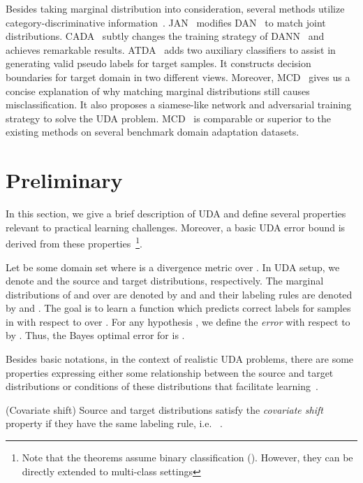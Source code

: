 \documentclass[10pt,twocolumn,letterpaper]{article}
\begin{document}
Besides taking marginal distribution into consideration, several methods utilize category-discriminative information~\cite{8451152,10.1007/978-3-030-01424-7_34,DAS201880}. JAN~\cite{long2017deep} modifies DAN~\cite{pmlr-v37-long15} to match joint distributions. CADA~\cite{long2018conditional} subtly changes the training strategy of DANN~\cite{ganin2016domain} and achieves remarkable results. ATDA~\cite{pmlr-v70-saito17a} adds two auxiliary classifiers to assist in generating valid pseudo labels for target samples. It constructs decision boundaries for target domain in two different views. Moreover, MCD~\cite{saito2018maximum} gives us a concise explanation of why matching marginal distributions still causes misclassification. It also proposes a siamese-like network and adversarial training strategy to solve the UDA problem. MCD~\cite{saito2018maximum} is comparable or superior to the existing methods on several benchmark domain adaptation datasets.

\section{Preliminary}
\label{prelinary}
In this section, we give a brief description of UDA and define several properties relevant to practical learning challenges. Moreover, a basic UDA error bound is derived from these properties~\cite{Ben-David2014}\footnote {Note that the theorems assume binary classification (). However, they can be directly extended to multi-class settings}. 

Let  be some domain set where  is a divergence metric over . In UDA setup, we denote  and  the source and target distributions, respectively. The marginal distributions of  and  over  are denoted by  and  and their labeling rules are denoted by  and . The goal is to learn a function  which predicts correct labels for samples in  with respect to  over . For any hypothesis , we define the \textit{error} with respect to  by . Thus, the Bayes optimal error for  is .


Besides basic notations, in the context of realistic UDA problems, there are some properties expressing either some relationship between the source and target distributions or conditions of these distributions that facilitate learning~\cite{Ben-David2014}.
\begin{customdef}{1}
(Covariate shift) Source and target distributions satisfy the \textit{covariate shift} property if they have the same labeling rule, i.e. ~\cite{Sugiyama05generalizationerror}.
\label{def1}
\end{customdef}
\end{document}
